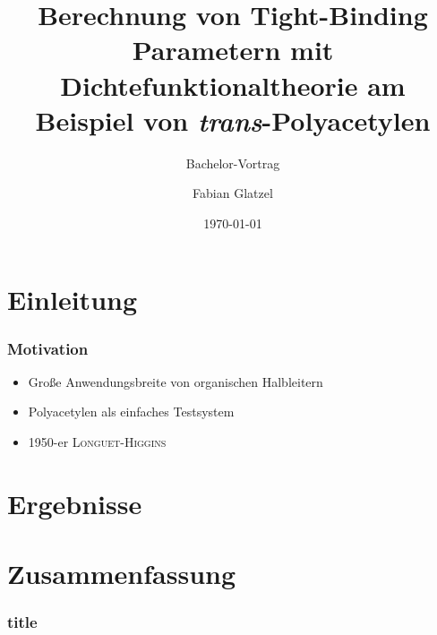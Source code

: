 \documentclass[11pt]{beamer}
\author{Fabian Glatzel}
\title[Bachelor Vortrag]{Berechnung von Tight-Binding Parametern mit Dichtefunktionaltheorie am Beispiel von \emph{trans}-Polyacetylen}
\subtitle{Bachelor-Vortrag}
\institute{Physikalisches Institut}
\date{\today}
\begin{document}
\begin{frame}[plain]
	\maketitle
\end{frame}

\begin{frame}
\tableofcontents
\end{frame}

\section{Einleitung}
\begin{frame}
\frametitle{Motivation}
\begin{itemize}
\item Große Anwendungsbreite von organischen Halbleitern
\item Polyacetylen als einfaches Testsystem
\item 1950-er \textsc{Longuet-Higgins}
\end{itemize}
\end{frame}

\section{Ergebnisse}
\begin{frame}
	\frametitle{}
\end{frame}

\section{Zusammenfassung}
\begin{frame}
	\frametitle{title}
\end{frame}
\end{document}
